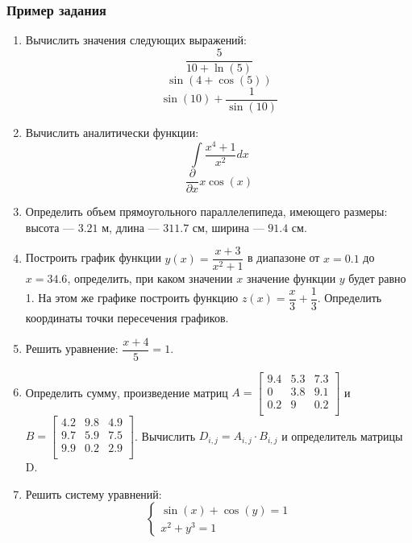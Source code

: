 \subsubsection*{Пример задания}
\begin{enumerate}
	\item Вычислить значения следующих выражений: 
	\begin{equation*}\dfrac{5}{10+\ln(5)}              \end{equation*}
	\begin{equation*}\sin(4+\cos(5))                   \end{equation*}
	\begin{equation*}\sin(10)+\dfrac{1}{\sin(10)}      \end{equation*}
	
	\item Вычислить аналитически функции: 
	\begin{equation*} \int \dfrac{x^4+1}{x^2} dx                \end{equation*}\begin{equation*} \dfrac{\partial} {\partial x} x\cos(x)              \end{equation*}
	
	
	\item Определить объем прямоугольного параллелепипеда, имеющего размеры: высота --- $3.21$ м, длина --- $311.7$ см, ширина --- $91.4$ см.
	
	\item Построить график функции $y(x)=\dfrac{x+3}{x^2+1}    $ в диапазоне от $x=0.1$ до $x=34.6$, определить, при каком значении $x$ значение функции $y$ будет равно 1. На этом же графике построить функцию $z(x)=\dfrac{x}{3}+\dfrac{1}{3} $. Определить координаты точки пересечения графиков. \item Решить уравнение: $\dfrac{x+4}{5}=1.     $
	
	\item Определить сумму, произведение матриц $A=\begin{bmatrix}
	9.4 &5.3 &7.3 \\
	0 &3.8 &9.1 \\
	0.2 &9 &0.2 \\
	\end{bmatrix}
	$ и $B=\begin{bmatrix}
	4.2 &9.8 &4.9 \\
	9.7 &5.9 &7.5 \\
	9.9 &0.2 &2.9 \\
	\end{bmatrix}
	$. Вычислить $D_{i,j}=A_{i,j}  \cdot  B_{i,j}$ и определитель матрицы D.
	
	\item Решить систему уравнений: \begin{equation*} \begin{cases} \sin(x)+\cos(y)=1    \\ x^2 + y^3=1               \end{cases} \end{equation*} 
\end{enumerate}

